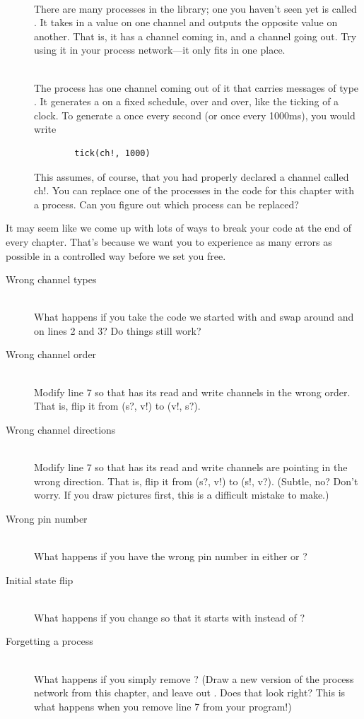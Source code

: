 \begin{description}
	\item[\il]\ \\
	There are many processes in the \plumbing library; one you haven't seen yet is called \il. It takes in a \LEVELT value on one channel and outputs the opposite value on another. That is, it has a \LEVELT channel coming in, and a \LEVELT channel going out. Try using it in your process network---it only fits in one place.
	\item[\tick]\ \\
	The \tick process has one channel coming out of it that carries messages of type \SIGNALT. It generates a \SIGNALV on a fixed schedule, over and over, like the ticking of a clock. To generate a \SIGNALV once every second (or once every 1000ms), you would write
	\begin{verbatim}
		tick(ch!, 1000)
	\end{verbatim}
	This assumes, of course, that you had properly declared a channel called {\code ch!}. You can replace one of the processes in the code for this chapter with a \tick process. Can you figure out which process can be replaced?
\end{description}

\BREAKAGE
It may seem like we come up with lots of ways to break your code at the end of every chapter. That's because we want you to experience as many errors as possible in a controlled way before we set you free.

\begin{description}
	\item[Wrong channel types]\ \\
	What happens if you take the code we started with and swap around \SIGNALT and \LEVELT on lines 2 and 3? Do things still work?
	\item[Wrong channel order]\ \\
	Modify line 7 so that \toggle has its read and write channels in the wrong order. That is, flip it from {\code (s?, v!)} to {\code (v!, s?)}.
	\item[Wrong channel directions]\ \\
		Modify line 7 so that \toggle has its read and write channels are pointing in the wrong direction. That is, flip it from {\code (s?, v!)} to {\code (s!, v?)}. (Subtle, no? Don't worry. If you draw pictures first, this is a difficult mistake to make.)
  \item[Wrong pin number]\ \\
	What happens if you have the wrong pin number in either \bp or \pl?
	\item[Initial state flip]\ \\
	What happens if you change \pl so that it starts with \HIGH instead of \LOW?
	\item[Forgetting a process]\ \\
	What happens if you simply remove \toggle? (Draw a new version of the process network from this chapter, and leave out \toggle. Does that look right? This is what happens when you remove line 7 from your program!)
\end{description}	
	
	

